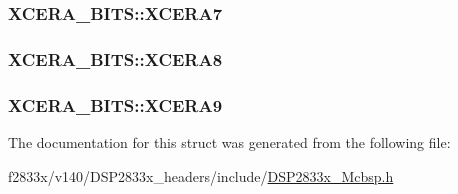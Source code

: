 \subsubsection[{X\+C\+E\+R\+A7}]{ X\+C\+E\+R\+A\+\_\+\+B\+I\+T\+S\+::\+X\+C\+E\+R\+A7}\label{struct_x_c_e_r_a___b_i_t_s_ae2ccf3d1dfe5cfe1809d55270e5cb08f}
\hypertarget{struct_x_c_e_r_a___b_i_t_s_acf9d9b88fae7bbdba1275f7a98177a06}{}
\subsubsection[{X\+C\+E\+R\+A8}]{ X\+C\+E\+R\+A\+\_\+\+B\+I\+T\+S\+::\+X\+C\+E\+R\+A8}\label{struct_x_c_e_r_a___b_i_t_s_acf9d9b88fae7bbdba1275f7a98177a06}
\hypertarget{struct_x_c_e_r_a___b_i_t_s_a766ce7bdc0e695ff38e65b9b1967cfbe}{}
\subsubsection[{X\+C\+E\+R\+A9}]{ X\+C\+E\+R\+A\+\_\+\+B\+I\+T\+S\+::\+X\+C\+E\+R\+A9}\label{struct_x_c_e_r_a___b_i_t_s_a766ce7bdc0e695ff38e65b9b1967cfbe}


The documentation for this struct was generated from the following file\+:\begin{DoxyCompactItemize}
\item 
f2833x/v140/\+D\+S\+P2833x\+\_\+headers/include/\hyperlink{_d_s_p2833x___mcbsp_8h}{D\+S\+P2833x\+\_\+\+Mcbsp.\+h}\end{DoxyCompactItemize}
